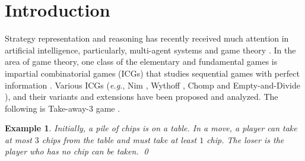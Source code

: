 \documentclass[review]{elsarticle}
\newcommand\eg{{\it e.g.}}
\newtheorem{example}{Example}
\begin{document}

\section{Introduction}
	Strategy representation and reasoning has recently received much attention in artificial intelligence, particularly, multi-agent systems and game theory \cite{ChaHP2010,ZhangT2015,XiongL2016a}.
	In the area of game theory, one class of the elementary and fundamental games is impartial combinatorial games (ICGs) that studies sequential games with perfect information \cite{Fer2018}.
	Various ICGs (\eg, Nim \cite{Bou1901}, Wythoff \cite{Wyt1907}, Chomp \cite{Sch1952} and Empty-and-Divide \cite{Fer1998}), and their variants and extensions \cite{LiuZ2015,AhnCCEFGGKMPS2017} have been proposed and analyzed.
	The following is Take-away-$3$ game \cite{Gol1966}.
	
	\begin{example}	\label{exm:chomp} \rm
		Initially, a pile of chips is on a table.
		In a move, a player can take at most $3$ chips from the table and must take at least $1$ chip.
		The loser is the player who has no chip can be taken. \qed
	\end{example}	
		
\end{document}
